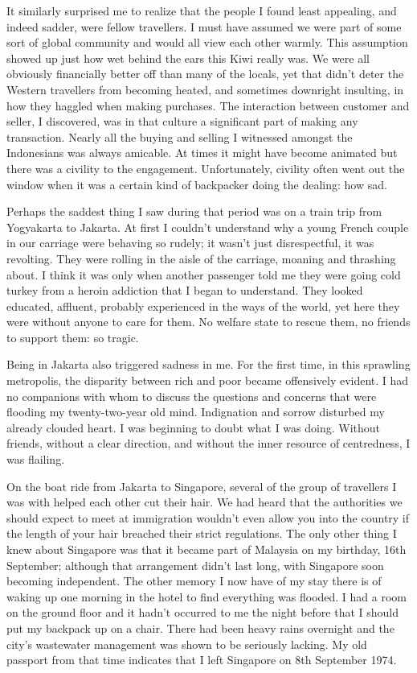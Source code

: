 It similarly surprised me to realize that the people I found least
appealing, and indeed sadder, were fellow travellers. I must have
assumed we were part of some sort of global community and would all view
each other warmly. This assumption showed up just how wet behind the
ears this Kiwi really was. We were all obviously financially better off
than many of the locals, yet that didn't deter the Western travellers
from becoming heated, and sometimes downright insulting, in how they
haggled when making purchases. The interaction between customer and
seller, I discovered, was in that culture a significant part of making
any transaction. Nearly all the buying and selling I witnessed amongst
the Indonesians was always amicable. At times it might have become
animated but there was a civility to the engagement. Unfortunately,
civility often went out the window when it was a certain kind of
backpacker doing the dealing: how sad.

Perhaps the saddest thing I saw during that period was on a train trip
from Yogyakarta to Jakarta. At first I couldn't understand why a young
French couple in our carriage were behaving so rudely; it wasn't just
disrespectful, it was revolting. They were rolling in the aisle of the
carriage, moaning and thrashing about. I think it was only when another
passenger told me they were going cold turkey\cite{turkey}
from a heroin addiction that I began to understand.
They looked educated, affluent, probably experienced in the ways of the
world, yet here they were without anyone to care for them. No welfare
state to rescue them, no friends to support them: so tragic.

Being in Jakarta also triggered sadness in me. For the first time, in
this sprawling metropolis, the disparity between rich and poor became
offensively evident. I had no companions with whom to discuss the
questions and concerns that were flooding my twenty-two-year old mind.
Indignation and sorrow disturbed my already clouded heart. I was
beginning to doubt what I was doing. Without friends, without a clear
direction, and without the inner resource of centredness, I was
flailing.

On the boat ride from Jakarta to Singapore, several of the group of
travellers I was with helped each other cut their hair. We had heard
that the authorities we should expect to meet at immigration wouldn't
even allow you into the country if the length of your hair breached
their strict regulations. The only other thing I knew about Singapore
was that it became part of Malaysia\cite{malaysia}
on my birthday, 16th September; although that arrangement
didn't last long, with Singapore soon becoming independent. The other
memory I now have of my stay there is of waking up one morning in the
hotel to find everything was flooded. I had a room on the ground floor
and it hadn't occurred to me the night before that I should put my
backpack up on a chair. There had been heavy rains overnight and the
city's wastewater management was shown to be seriously lacking. My old
passport from that time indicates that I left Singapore on 8th September
1974.

